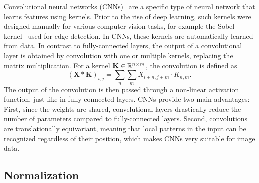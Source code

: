 Convolutional neural networks (CNNs)~\cite{CNN} are a specific type of neural network that learns features using
kernels.
Prior to the rise of deep learning, such kernels were designed manually for various computer vision tasks, for example
the Sobel kernel~\cite{Sobel} used for edge detection.
In CNNs, these kernels are automatically learned from data. In contrast to fully-connected layers, the output of a
convolutional layer is obtained by convolution with one or multiple kernels, replacing the matrix multiplication.
For a kernel $\mathbf{K} \in \mathbb{R}^{n \times m}$, the convolution is defined as
\begin{equation}
    (\mathbf{X} \ast \mathbf{K})_{i,j} = \sum_{n}\sum_{m} X_{i+n,j+m} \cdot K_{n,m}.
\end{equation}
The output of the convolution is then passed through a non-linear activation function, just like in fully-connected
layers.
CNNs provide two main advantages: First, since the weights are shared, convolutional layers drastically reduce the
number of parameters compared to fully-connected layers. 
Second, convolutions are translationally equivariant, meaning that local patterns in the input can be recognized 
regardless of their position, which makes CNNs very suitable for image data.~\cite{DeepLearning}

\subsection{Normalization}

\newcommand{\cube}[2]{
    \fill[gray!10, opacity=0.5] (0,0,\a) -- (\a,0,\a) -- (\a,\a,\a) -- (0,\a,\a) -- cycle;
    \fill[gray!10, opacity=0.5] (0,0,0) -- (\a,0,0) -- (\a,0,\a) -- (0,0,\a) -- cycle;
    \fill[gray!10, opacity=0.5] (0,0,0) -- (0,\a,0) -- (0,\a,\a) -- (0,0,\a) -- cycle;

    \draw[thick] (0,#1,0) -- (0,0,0) -- (#1,0,0);
    \draw[thick] (0,#1,0) -- (0,#1,#1);
    \draw[thick] (0,0,0) -- (0,0,#1);
    \draw[thick] (#1,0,0) -- (#1,0,#1);
    \draw[thick] (0,#1,#1) -- (0,0,#1) -- (#1,0,#1) -- (#1,#1,#1) -- cycle;

    \foreach \i in {1,2,...,#1} {
        \draw[very thin] (0,\i,0) -- (0,\i,#1);
        \draw[very thin] (0,0,\i) -- (0,#1,\i);

        \draw[very thin] (\i,0,0) -- (\i,0,#1);
        \draw[very thin] (0,0,\i) -- (#1,0,\i);

        \draw[very thin] (\i,0,#1) -- (\i,#1,#1);
        \draw[very thin] (0,\i,#1) -- (#1,\i,#1);
    }

    \node[rotate=90] at (0,#1,#1/2) [above] {$H,W$};
    \node at (0,#1/2,0) [below left] {$C$};
    \node at (#1/2,0,0) [below right] {$N$};

    \node at (#1,#1,#1+1) {#2};
}

